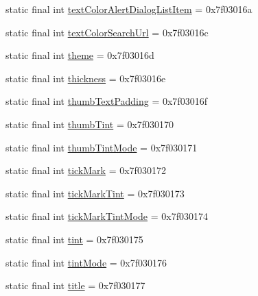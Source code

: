 \begin{DoxyCompactItemize}
\item 
static final int \mbox{\hyperlink{classandroid_1_1support_1_1v7_1_1appcompat_1_1R_1_1attr_a8fac1b5ad37c5960fe92a3fa9c5ad14d}{text\+Color\+Alert\+Dialog\+List\+Item}} = 0x7f03016a
\item 
static final int \mbox{\hyperlink{classandroid_1_1support_1_1v7_1_1appcompat_1_1R_1_1attr_a90c011a6893d57e7ac36d2f522dac1ac}{text\+Color\+Search\+Url}} = 0x7f03016c
\item 
static final int \mbox{\hyperlink{classandroid_1_1support_1_1v7_1_1appcompat_1_1R_1_1attr_a182cfd2eff31084c29174d1a2ab3ada2}{theme}} = 0x7f03016d
\item 
static final int \mbox{\hyperlink{classandroid_1_1support_1_1v7_1_1appcompat_1_1R_1_1attr_ad8eecd497c12c8ccd6ad92168b2e3aec}{thickness}} = 0x7f03016e
\item 
static final int \mbox{\hyperlink{classandroid_1_1support_1_1v7_1_1appcompat_1_1R_1_1attr_aec2704ebce5f1829511eee80aa7c16cf}{thumb\+Text\+Padding}} = 0x7f03016f
\item 
static final int \mbox{\hyperlink{classandroid_1_1support_1_1v7_1_1appcompat_1_1R_1_1attr_acfe04bf2bd21989662fb27261b896513}{thumb\+Tint}} = 0x7f030170
\item 
static final int \mbox{\hyperlink{classandroid_1_1support_1_1v7_1_1appcompat_1_1R_1_1attr_a297f9715165a2c2b08288626b9168091}{thumb\+Tint\+Mode}} = 0x7f030171
\item 
static final int \mbox{\hyperlink{classandroid_1_1support_1_1v7_1_1appcompat_1_1R_1_1attr_a938957cf3c3bced2a192ad119530c33c}{tick\+Mark}} = 0x7f030172
\item 
static final int \mbox{\hyperlink{classandroid_1_1support_1_1v7_1_1appcompat_1_1R_1_1attr_a8d423c0748d4348dba773edc32f4ba66}{tick\+Mark\+Tint}} = 0x7f030173
\item 
static final int \mbox{\hyperlink{classandroid_1_1support_1_1v7_1_1appcompat_1_1R_1_1attr_ab3e5ef28ce3471ab53b2318aa990f48a}{tick\+Mark\+Tint\+Mode}} = 0x7f030174
\item 
static final int \mbox{\hyperlink{classandroid_1_1support_1_1v7_1_1appcompat_1_1R_1_1attr_ac10effefdca17643f5f38c68b2dd9802}{tint}} = 0x7f030175
\item 
static final int \mbox{\hyperlink{classandroid_1_1support_1_1v7_1_1appcompat_1_1R_1_1attr_af35dd65ec9d4f87eb9da6f17e05f5f0d}{tint\+Mode}} = 0x7f030176
\item 
static final int \mbox{\hyperlink{classandroid_1_1support_1_1v7_1_1appcompat_1_1R_1_1attr_a5c7c9d2df9addf881809723588ed65a5}{title}} = 0x7f030177

\end{DoxyCompactItemize}
